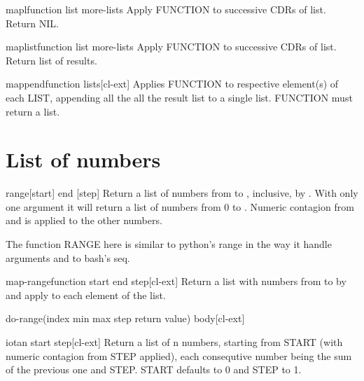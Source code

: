 \documentclass[10pt,english]{book}
\begin{document}
\begin{function}{mapl}{function list \rest more-lists}
  Apply FUNCTION to successive CDRs of list. Return NIL.
\end{function}

\begin{function}{maplist}{function list \rest more-lists}
  Apply FUNCTION to successive CDRs of list. Return list of results.
\end{function}

\begin{function}{mappend}{function \rest lists}[cl-ext]
  Applies FUNCTION to respective element(s) of each LIST, appending all the
all the result list to a single list. FUNCTION must return a list.
\end{function}

\section{List of numbers}
\label{sec:list-numbers}

\begin{function}{range}{[start] end [step]}
  Return a list of numbers from  to , inclusive,
  by . With only one argument it will return a list of
  numbers from 0 to . Numeric contagion from  and
   is applied to the other numbers.
\begin{devnote}
  The function RANGE here is similar to python's range in the way it
  handle arguments and to bash's seq.
\end{devnote}
\end{function}

\begin{function}{map-range}{function start end \op step}[cl-ext]
  Return a list with numbers from  to  by 
  and apply  to each element of the list.
\end{function}

\begin{macro}{do-range}{(index \op min max step return value) \body body}[cl-ext]
  
\end{macro}

\begin{function}{iota}{n \key start step}[cl-ext]
  Return a list of n numbers, starting from START (with numeric
  contagion from STEP applied), each consequtive number being the sum
  of the previous one and STEP. START defaults to 0 and STEP to 1.
\end{function}
\end{document}
